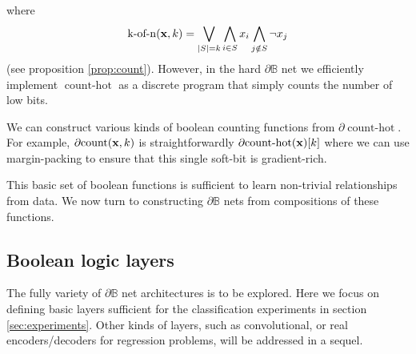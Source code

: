 \documentclass{article} %
\begin{document}
where
\begin{equation*}
\operatorname{k-of-n}({\bf x}, k) = \bigvee_{|S|=k} \bigwedge_{i\in S} x_i \bigwedge_{j\notin S} \neg x_j
\end{equation*}
(see proposition \ref{prop:count}). However, in the hard $\partial\mathbb{B}$ net we efficiently implement $\operatorname{count-hot}$ as a discrete program that simply counts the number of low bits.

We can construct various kinds of boolean counting functions from $\partial\!\operatorname{count-hot}$. For example, $\partial\!\operatorname{count}({\bf x}, k)$ is straightforwardly $\partial\!\operatorname{count-hot}({\bf x})[k]$ where we can use margin-packing to ensure that this single soft-bit is gradient-rich.

This basic set of boolean functions is sufficient to learn non-trivial relationships from data. We now turn to constructing $\partial\mathbb{B}$ nets from compositions of these functions.

\subsection{Boolean logic layers}

The fully variety of $\partial\mathbb{B}$ net architectures is to be explored. Here we focus on defining basic layers sufficient for the classification experiments in section \ref{sec:experiments}. Other kinds of layers, such as convolutional, or real encoders/decoders for regression problems, will be addressed in a sequel.
\end{document}
